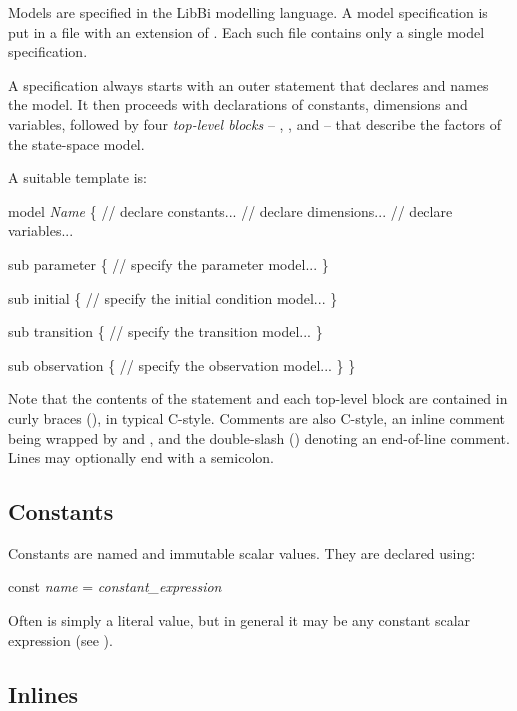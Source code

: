 Models are specified in the LibBi modelling language. A model specification is
put in a file with an extension of . Each such file contains only a
single model specification.

A specification always starts with an outer  statement that
declares and names the model. It then proceeds with declarations of constants,
dimensions and variables, followed by four \emph{top-level blocks} --
, ,  and
 -- that describe the factors of the state-space model.

A suitable template is:
\begin{bicode}
model \textsl{Name} \{
  // declare constants...
  // declare dimensions...
  // declare variables...

  sub parameter \{
    // specify the parameter model...
  \}

  sub initial \{
    // specify the initial condition model...
  \}

  sub transition \{
    // specify the transition model...
  \}

  sub observation \{
    // specify the observation model...
  \}
\}
\end{bicode}

Note that the contents of the  statement and each top-level block
are contained in curly braces (\bitt{\{\(\ldots\)\}}), in typical
C-style. Comments are also C-style, an inline comment being wrapped by
\bitt{/*} and \bitt{*/}, and the double-slash (\bitt{//}) denoting an
end-of-line comment. Lines may optionally end with a semicolon.

\subsection{Constants\label{Constants}}

Constants are named and immutable scalar values. They are declared using:
\begin{bicode}
const \emph{name} = \emph{constant_expression}
\end{bicode}
Often  is simply a literal value, but in
general it may be any constant scalar expression (see
).

\subsection{Inlines\label{Inlines}}

